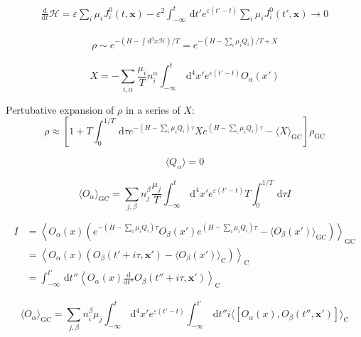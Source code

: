 \documentclass[master,       %
               twoside,        %
               BCOR10mm,       %
               english,ngerman, %
               ]{GAUBM}
\begin{document}
\begin{otherlanguage}{english}
\begin{align}
	\frac{\mathrm{d}}{\mathrm{d} t} \mathcal{H} = \varepsilon \sum_i \mu_i J_i^0(t, \mathbf{x}) - \varepsilon^2 \int_{- \infty}^t \, \mathrm{d}t' e^{\varepsilon (t' - t)} \sum_i \mu_i J_i^0(t', \mathbf{x}) \to 0 
\end{align}

\begin{align}
	\rho \sim e^{- (H - \int \mathrm{d}^3 x \mathcal{H}) / T} = e^{-(H - \sum_i \mu_i Q_i) / T + X}
\end{align}

\begin{equation}
	X = - \sum_{i, \alpha} \frac{\mu_i}{T} n_i^\alpha \int_{- \infty}^t \, \mathrm{d}^4 x' e^{\varepsilon(t' - t)} O_\alpha(x')
\end{equation}

Pertubative expansion of $\rho$ in a series of $X$:
\begin{equation}
	\rho \approx \left[ 1 + T \int_0^{1/T} \, \mathrm{d} \tau e^{-(H - \sum_i \mu_i Q_i) \tau} X e^{(H - \sum_i \mu_i Q_i) \tau} - \langle X \rangle_\mathrm{GC}  \right] \rho_\mathrm{GC} 
\end{equation}

\begin{equation}
	\langle Q_\alpha \rangle = 0
\end{equation}

\begin{equation}
	\langle O_\alpha \rangle_\mathrm{GC} = \sum_{j, \beta} n_j^\beta \frac{\mu_j}{T} \int_{- \infty}^t \, \mathrm{d}^4 x' e^{\varepsilon (t' - t)} T \int_{0}^{1/T} \, \mathrm{d} \tau I
\end{equation}

\begin{align}
	I &= \left\langle O_\alpha(x) \left( e^{-(H - \sum_i \mu_i Q_i) \tau} O_\beta(x') e^{(H - \sum_i \mu_i Q_i) \tau} - \langle O_\beta(x') \rangle_\mathrm{GC} \right)  \right\rangle_{\mathrm{GC}} \nonumber \\
	&= \left\langle O_\alpha(x) \left( O_\beta(t' + i \tau, \mathbf{x}') - \langle O_\beta(x') \rangle_\mathrm{C} \right) \right\rangle_\mathrm{C} \nonumber \\
	&= \int_{- \infty}^{t'} \, \mathrm{d} t'' \left\langle O_\alpha(x) \frac{\mathrm{d}}{\mathrm{d} t''} O_\beta(t'' + i \tau, \mathbf{x}') \right\rangle_{\mathrm{C}}
\end{align}

\begin{equation}
	\langle O_\alpha \rangle_\mathrm{GC} = \sum_{j, \beta} n_i^\beta \mu_j \int_{- \infty}^t \, \mathrm{d}^4 x' e^{\varepsilon(t' - t)} \int_{- \infty}^{t'} \, \mathrm{d} t'' i \langle [ O_\alpha(x), O_\beta(t'', \mathbf{x}')] \rangle_\mathrm{C}  
\end{equation}


\end{otherlanguage}
\end{document}
